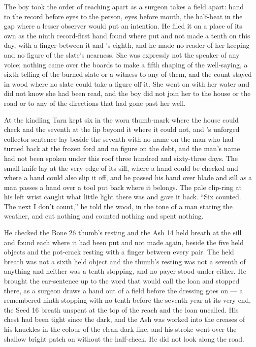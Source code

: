 The boy took the order of reaching apart as a surgeon takes a field apart: hand to the record before eyes to the person, eyes before mouth, the half-beat in the gap where a lesser observer would put an intention. He filed it on a place of its own as the ninth record-first hand found where put and not made a tenth on this day, with a finger between it and 's eighth, and he made no reader of her keeping and no figure of the slate's nearness. She was expressly not the speaker of any voice; nothing came over the boards to make a fifth shaping of the well-saying, a sixth telling of the burned slate or a witness to any of them, and the count stayed in wood where no slate could take a figure off it. She went on with her water and did not know she had been read, and the boy did not join her to the house or the road or to any of the directions that had gone past her well.

\scenebreak

At the kindling Tarn kept six in the worn thumb-mark where the house could check and the seventh at the lip beyond it where it could not, and 's unforged collector sentence lay beside the seventh with no name on the man who had turned back at the frozen ford and no figure on the debt, and the man's name had not been spoken under this roof three hundred and sixty-three days. The small knife lay at the very edge of its sill, where a hand could be checked and where a hand could also slip it off, and he passed his hand over blade and sill as a man passes a hand over a tool put back where it belongs. The pale clip-ring at his left wrist caught what little light there was and gave it back. “Six counted. The next I don't count,” he told the wood, in the tone of a man stating the weather, and cut nothing and counted nothing and spent nothing.

He checked the Bone 26 thumb's resting and the Ash 14 held breath at the sill and found each where it had been put and not made again, beside the five held objects and the pot-crack resting with a finger between every pair. The held breath was not a sixth held object and the thumb's resting was not a seventh of anything and neither was a tenth stopping, and no payer stood under either. He brought the ear-sentence up to the word that would call the loan and stopped there, as a surgeon draws a hand out of a field before the dressing goes on — a remembered ninth stopping with no tenth before the seventh year at its very end, the Seed 16 breath unspent at the top of the reach and the loan uncalled. His chest had been tight since the dark, and the Ash was worked into the creases of his knuckles in the colour of the clean dark line, and his stroke went over the shallow bright patch on  without the half-check. He did not look along the road.

